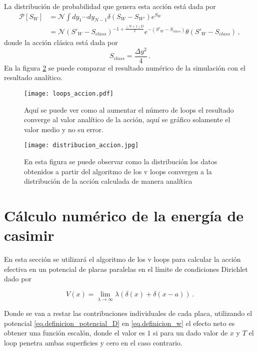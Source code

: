 La distribución de probabilidad que genera esta acción está dada por
\begin{align}
\mathcal{P} [S _W] &=  \mathcal{N} \int d y_1 \dotsb d y_{N-1} \delta \left( S_W - S_{W'}  \right) e ^{S_W}  \\
&=
 \mathcal{N} \left(  S' _W - S_{class} \right) ^{-1 + \frac{(N+1) D}{2}}
e ^{-\left( S' _W - S_{class} \right)}
\theta \left( S ' _W - S _{class} \right)
\, ,
\nonumber
\end{align}
donde la acción clásica está dada por
\begin{equation}
S _{class} = \frac{\Delta y ^2}{ 4}
\, .
\end{equation}
En la figura \ref{fig:distribucion_accion_cap4} se puede comparar el resultado numérico de la simulación con el resultado analítico.


\begin{figure}
    \centering
    \texttt{[image: loops\_accion.pdf]}
    \caption{Aquí se puede ver como al aumentar el número de loops el resultado converge al valor analítico de la acción, aquí se gráfico solamente el valor medio y no su error. }
    \label{fig:convergencia_loops}
\end{figure}

\begin{figure}
    \centering
    \texttt{[image: distribucion\_accion.jpg]}
    \caption{En esta figura se puede observar como la distribución los datos obtenidos a partir del algoritmo de los v loops convergen a la distribución de la acción calculada de manera analítica}
    \label{fig:distribucion_accion_cap4}
\end{figure}



\section{Cálculo numérico de la energía de casimir}


En esta sección se utilizará el algoritmo de los v loops para calcular la acción efectiva en un potencial de placas paralelas en el límite de condiciones Dirichlet dado por

\begin{equation}
V(x) = \lim _{\lambda \rightarrow \infty} \lambda \left( \delta (x) + \delta ( x - a) \right)
\, .
\label{eq.definicion_potencial_D}
\end{equation}

Donde se van a restar las contribuciones individuales de cada placa, utilizando el potencial \eqref{eq.definicion_potencial_D} en \eqref{eq.definicion_w} el efecto neto es obtener una función escalón, donde el valor es $1$ si para un dado valor de $x$ y $T$ el loop penetra ambas superficies y cero en el caso contrario. \\


